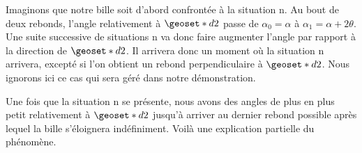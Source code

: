\medskip

Imaginons que notre bille soit d'abord confrontée à la situation n. Au bout de deux rebonds, l'angle relativement à $\geoset*{d}{2}$ passe de $\alpha_0 = \alpha$ à $\alpha_1 = \alpha + 2 \theta$. Une suite successive de situations n va donc faire augmenter l'angle par rapport à la direction de $\geoset*{d}{2}$. Il arrivera donc un moment où la situation n arrivera, excepté si l'on obtient un rebond perpendiculaire à $\geoset*{d}{2}$. Nous ignorons ici ce cas qui sera géré dans notre démonstration.

Une fois que la situation n se présente, nous avons des angles de plus en plus petit relativement à $\geoset*{d}{2}$ jusqu'à arriver au dernier rebond possible après lequel la bille s'éloignera indéfiniment. Voilà une explication partielle du phénomène.